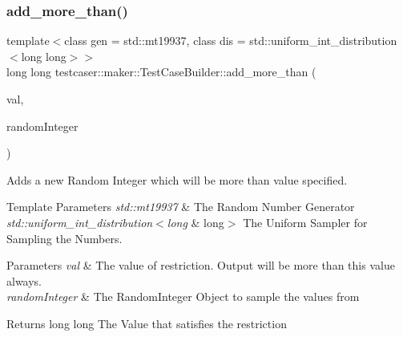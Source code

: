 \subsubsection{\texorpdfstring{add\_more\_than()}{add\_more\_than()}\hspace{0.1cm}{\footnotesize\ttfamily [1/2]}}
{\footnotesize\ttfamily template$<$class gen  = std\+::mt19937, class dis  = std\+::uniform\+\_\+int\+\_\+distribution$<$long long$>$$>$ \\
long long testcaser\+::maker\+::\+Test\+Case\+Builder\+::add\+\_\+more\+\_\+than (\begin{DoxyParamCaption}\item[{long long}]{val,  }\item[{\mbox{\hyperlink{classtestcaser_1_1maker_1_1types_1_1RandomInteger}{types\+::\+Random\+Integer}}$<$ gen, dis $>$ \&}]{random\+Integer }\end{DoxyParamCaption})\hspace{0.3cm}{\ttfamily [inline]}}



Adds a new Random Integer which will be more than value specified. 


\begin{DoxyTemplParams}{Template Parameters}
{\em std\+::mt19937} & The Random Number Generator \\
\hline
{\em std\+::uniform\+\_\+int\+\_\+distribution$<$long} & long$>$ The Uniform Sampler for Sampling the Numbers. \\
\hline
\end{DoxyTemplParams}

\begin{DoxyParams}{Parameters}
{\em val} & The value of restriction. Output will be more than this value always. \\
\hline
{\em random\+Integer} & The Random\+Integer Object to sample the values from \\
\hline
\end{DoxyParams}
\begin{DoxyReturn}{Returns}
long long The Value that satisfies the restriction 
\end{DoxyReturn}
\mbox{\label{classtestcaser_1_1maker_1_1TestCaseBuilder_a00745e4a312209178432e06d4c9aae08}} 
